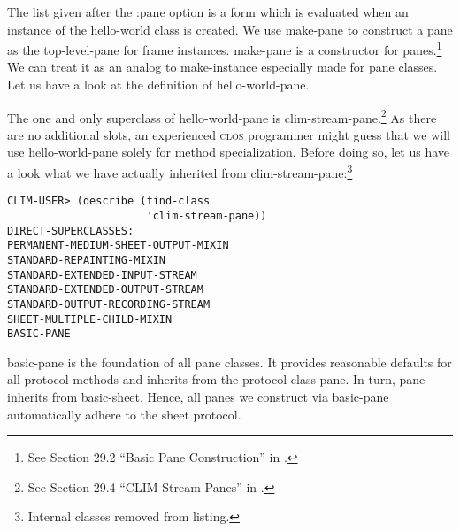 \documentclass[twocolumn,a4paper]{article}
\newcommand {\concept} [1] {{\sl #1}\index{#1}}
\newcommand {\code}[1]{{\sffamily #1}}
\newcommand {\CLOS}{\textsc{clos}}
\let\class\code
\let\method\code
\let\keyword\code
\begin{document}
The list given after the \keyword{:pane} option is a form which is
evaluated when an instance of the \class{hello-world} class is
created. We use \method{make-pane} to construct a pane as the
top-level-pane for frame instances. \method{make-pane} is a
constructor for panes.\footnote{See Section 29.2 ``Basic Pane
  Construction'' in \cite{clim-spec}.} We can treat it as an analog to
\code{make-instance} especially made for pane classes.  Let us have a
look at the definition of \class{hello-world-pane}.

\lstset{style=inlinestyle}  

The one and only superclass of \class{hello-world-pane} is
\class{clim-stream-pane}.\footnote{See Section 29.4 ``CLIM Stream
  Panes'' in \cite{clim-spec}.} As there are no additional slots, an
experienced \CLOS{} programmer might guess that we will use
\class{hello-world-pane} solely for method specialization.  Before doing so,
let us have a look what we have actually
inherited from \class{clim-stream-pane}:\footnote{Internal classes
  removed from listing.}

\lstset{style=inlinestyle}
\begin{lstlisting}
CLIM-USER> (describe (find-class 
                      'clim-stream-pane))
DIRECT-SUPERCLASSES: 
PERMANENT-MEDIUM-SHEET-OUTPUT-MIXIN
STANDARD-REPAINTING-MIXIN
STANDARD-EXTENDED-INPUT-STREAM
STANDARD-EXTENDED-OUTPUT-STREAM
STANDARD-OUTPUT-RECORDING-STREAM
SHEET-MULTIPLE-CHILD-MIXIN
BASIC-PANE
\end{lstlisting}


\class{basic-pane} is the foundation of all pane classes. It provides
reasonable defaults for all protocol methods and inherits from the
protocol class \class{pane}. In turn, \class{pane} inherits from
\class{basic-sheet}. Hence, all panes we construct via
\class{basic-pane} automatically adhere to the sheet protocol.


\end{document}
